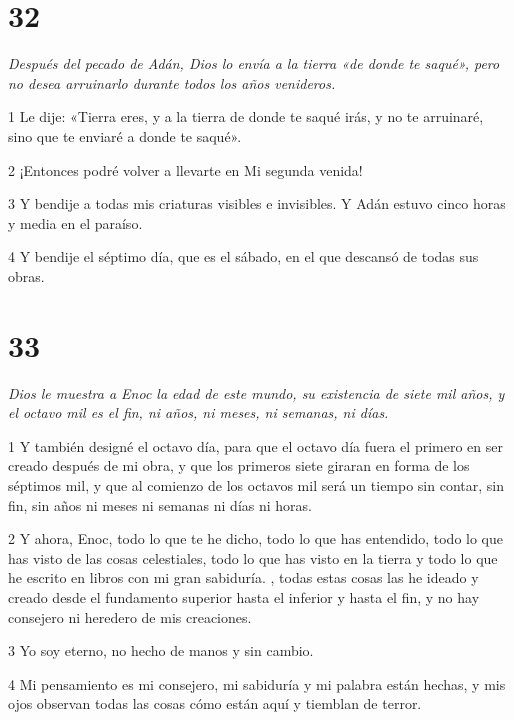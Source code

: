 \chapter{32}

\par \textit{Después del pecado de Adán, Dios lo envía a la tierra «de donde te saqué», pero no desea arruinarlo durante todos los años venideros.}

\par 1 Le dije: «Tierra eres, y a la tierra de donde te saqué irás, y no te arruinaré, sino que te enviaré a donde te saqué».

\par 2 ¡Entonces podré volver a llevarte en Mi segunda venida!

\par 3 Y bendije a todas mis criaturas visibles e invisibles. Y Adán estuvo cinco horas y media en el paraíso.

\par 4 Y bendije el séptimo día, que es el sábado, en el que descansó de todas sus obras.

\chapter{33}

\par \textit{Dios le muestra a Enoc la edad de este mundo, su existencia de siete mil años, y el octavo mil es el fin, ni años, ni meses, ni semanas, ni días.}

\par 1 Y también designé el octavo día, para que el octavo día fuera el primero en ser creado después de mi obra, y que los primeros siete giraran en forma de los séptimos mil, y que al comienzo de los octavos mil será un tiempo sin contar, sin fin, sin años ni meses ni semanas ni días ni horas.

\par 2 Y ahora, Enoc, todo lo que te he dicho, todo lo que has entendido, todo lo que has visto de las cosas celestiales, todo lo que has visto en la tierra y todo lo que he escrito en libros con mi gran sabiduría. , todas estas cosas las he ideado y creado desde el fundamento superior hasta el inferior y hasta el fin, y no hay consejero ni heredero de mis creaciones.

\par 3 Yo soy eterno, no hecho de manos y sin cambio.

\par 4 Mi pensamiento es mi consejero, mi sabiduría y mi palabra están hechas, y mis ojos observan todas las cosas cómo están aquí y tiemblan de terror.

